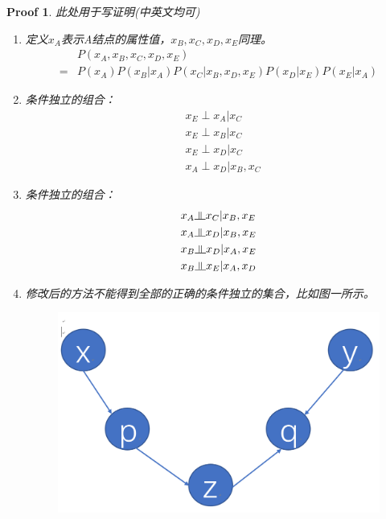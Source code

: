 \documentclass[a4paper,UTF8]{article}
\numberwithin{equation}{section}
\newtheorem*{myProof}{Proof}
\newcommand{\indep}{\rotatebox[origin=c]{90}{$\models$}}
\begin{document}
\begin{myProof}
	此处用于写证明(中英文均可)
	~\\
\begin{enumerate}[(1)]
\item 
定义$x_A$表示A结点的属性值，$x_B,x_C,x_D,x_E$同理。\\
\begin{equation}
\begin{aligned}
&P(x_A,x_B,x_C,x_D,x_E)\\ 
=& P(x_A)P(x_B|x_A)P(x_C|x_B,x_D,x_E)P(x_D|x_E)P(x_E|x_A)
\end{aligned}
\end{equation}
\item 
条件独立的组合：\\
\begin{equation}
\begin{aligned}
&x_E \perp x_A | x_C\\
&x_E \perp x_B | x_C\\
&x_E \perp x_D | x_C\\
&x_A \perp x_D | x_B, x_C
\end{aligned}
\end{equation}
\item 
条件独立的组合：\\
\begin{equation}
\begin{aligned}
&x_A \indep x_C | x_B,x_E\\
&x_A \indep x_D | x_B,x_E\\
&x_B \indep x_D | x_A,x_E\\
&x_B \indep x_E | x_A,x_D
\end{aligned}
\end{equation}
\item 
修改后的方法不能得到全部的正确的条件独立的集合，比如图一所示。\\
\begin{figure}[!ht]
	\centering
	\includegraphics[scale=0.3]{bayes.png}

\end{figure}
\end{enumerate}
\end{myProof}
\end{document}
